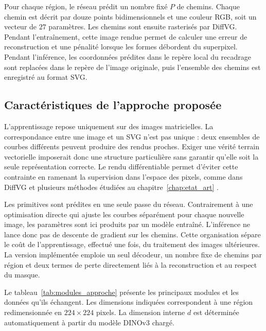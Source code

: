 \documentclass[12pt, a4paper, oneside]{report}
\begin{document}
Pour chaque région, le réseau prédit un nombre fixé $P$ de chemins. Chaque chemin est décrit par douze points bidimensionnels et une couleur RGB, soit un vecteur de $27$ paramètres. Les chemins sont ensuite rasterisés par DiffVG. Pendant l'entraînement, cette image rendue permet de calculer une erreur de reconstruction et une pénalité lorsque les formes débordent du superpixel. Pendant l'inférence, les coordonnées prédites dans le repère local du recadrage sont replacées dans le repère de l'image originale, puis l'ensemble des chemins est enregistré au format SVG.

\subsection{Caractéristiques de l'approche proposée}

L'apprentissage repose uniquement sur des images matricielles. La correspondance entre une image et un SVG n'est pas unique : deux ensembles de courbes différents peuvent produire des rendus proches. Exiger une vérité terrain vectorielle imposerait donc une structure particulière sans garantir qu'elle soit la seule représentation correcte. Le rendu différentiable permet d'éviter cette contrainte en ramenant la supervision dans l'espace des pixels, comme dans DiffVG et plusieurs méthodes étudiées au chapitre~\ref{chap:etat_art} \cite{li2020diffvg,reddy2021im2vec}.

Les primitives sont prédites en une seule passe du réseau. Contrairement à une optimisation directe qui ajuste les courbes séparément pour chaque nouvelle image, les paramètres sont ici produits par un modèle entraîné. L'inférence ne lance donc pas de descente de gradient sur les chemins. Cette organisation sépare le coût de l'apprentissage, effectué une fois, du traitement des images ultérieures. La version implémentée emploie un seul décodeur, un nombre fixe de chemins par région et deux termes de perte directement liés à la reconstruction et au respect du masque.

Le tableau~\ref{tab:modules_approche} présente les principaux modules et les données qu'ils échangent. Les dimensions indiquées correspondent à une région redimensionnée en $224 \times 224$ pixels. La dimension interne $d$ est déterminée automatiquement à partir du modèle DINOv3 chargé.
\end{document}
